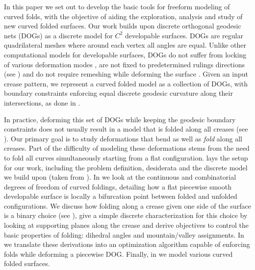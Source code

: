 In this paper we set out to develop the basic tools for freeform modeling of curved folds, with the objective of aiding the exploration, analysis and study of new curved folded surfaces. Our work builds upon discrete orthogonal geodesic nets (DOGs) \cite{rabi18,rabi2018shape} as a discrete model for $C^2$ developable surfaces. DOGs are regular quadrilateral meshes where around each vertex all angles are equal. Unlike other computational models for developable surfaces, DOGs do not suffer from locking of various deformation modes \cite{locking1,locking2,grin_shells}, are not fixed to predetermined rulings directions \cite{pottmann_new,curved_folding_kilian,stein_dev} (see ) and do not require remeshing while deforming the surface \cite{StringActuated:2017,SchreckEG2017,Narain}. Given an input crease pattern, we represent a curved folded model as a collection of DOGs, with boundary constraints enforcing equal discrete geodesic curvature along their intersections, as done in \cite{rabi2018shape}.


In practice, deforming this set of DOGs while keeping the geodesic boundary constraints does not usually result in a model that is folded along all creases (see ). Our primary goal is to study deformations that bend as well as \emph{fold} along all creases. Part of the difficulty of modeling these deformations stems from the need to fold all curves simultaneously starting from a flat configuration.  lays the setup for our work, including the problem definition, desiderata and the discrete model we build upon (taken from \cite{rabi18,rabi2018shape}). In  we look at the continuous and combinatorial degrees of freedom of curved foldings, detailing how a flat piecewise smooth developable surface is locally a bifurcation point between folded and unfolded configurations. We discuss how folding along a crease given one side of the surface is a binary choice (see ), give a simple discrete characterization for this choice by looking at supporting planes along the crease and derive objectives to control the basic properties of folding: dihedral angles and mountain/valley assignments. In  we translate these derivations into an optimization algorithm capable of enforcing folds while deforming a piecewise DOG. Finally, in  we model various curved folded surfaces.


